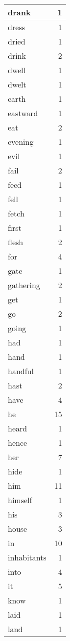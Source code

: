 \begin{center}
\begin{longtable}{l|r}
drank & 1\\ \hline 
dress & 1\\ \hline 
dried & 1\\ \hline 
drink & 2\\ \hline 
dwell & 1\\ \hline 
dwelt & 1\\ \hline 
earth & 1\\ \hline 
eastward & 1\\ \hline 
eat & 2\\ \hline 
evening & 1\\ \hline 
evil & 1\\ \hline 
fail & 2\\ \hline 
feed & 1\\ \hline 
fell & 1\\ \hline 
fetch & 1\\ \hline 
first & 1\\ \hline 
flesh & 2\\ \hline 
for & 4\\ \hline 
gate & 1\\ \hline 
gathering & 2\\ \hline 
get & 1\\ \hline 
go & 2\\ \hline 
going & 1\\ \hline 
had & 1\\ \hline 
hand & 1\\ \hline 
handful & 1\\ \hline 
hast & 2\\ \hline 
have & 4\\ \hline 
he & 15\\ \hline 
heard & 1\\ \hline 
hence & 1\\ \hline 
her & 7\\ \hline 
hide & 1\\ \hline 
him & 11\\ \hline 
himself & 1\\ \hline 
his & 3\\ \hline 
house & 3\\ \hline 
in & 10\\ \hline 
inhabitants & 1\\ \hline 
into & 4\\ \hline 
it & 5\\ \hline 
know & 1\\ \hline 
laid & 1\\ \hline 
land & 1\\ \hline 

\end{longtable}
\end{center}
